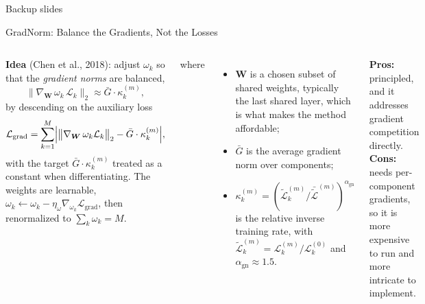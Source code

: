 \documentclass[aspectratio=169,11pt]{beamer}
\newcommand{\emphc}[1]{\textcolor{harvardcrimson}{#1}}
\begin{document}

\appendix

\begin{frame}{}
\begin{center}
{\Huge \textcolor{uzhblue}{Backup slides}}
\end{center}
\end{frame}

\begin{frame}{GradNorm: Balance the Gradients, Not the Losses}
\begin{columns}[T]
\textbf{Idea} (Chen et al., 2018): adjust $\omega_k$ so that the \emph{gradient norms} are balanced,
\[
    \bigl\|\nabla_{\bm{W}}\, \omega_k \, \mathcal{L}_k\bigr\|_2 \approx \bar{G} \cdot \kappa_k^{(m)} ,
\]
by descending on the auxiliary loss
\[
    \mathcal{L}_{\mathrm{grad}} = \sum_{k=1}^{M} \Bigl| \bigl\| \nabla_{\bm{W}}\, \omega_k \mathcal{L}_k \bigr\|_2 - \bar{G} \cdot \kappa_k^{(m)} \Bigr| ,
\]
with the target $\bar G \cdot \kappa_k^{(m)}$ treated as a \emphc{constant} when differentiating. The weights are learnable, $\omega_k \gets \omega_k - \eta_\omega \nabla_{\omega_k} \mathcal{L}_{\mathrm{grad}}$, then renormalized to $\sum_k \omega_k = M$.

where
\begin{itemize}\itemsep2pt\footnotesize
    \item $\bm{W}$ is a \emphc{chosen subset of shared weights}, typically the last shared layer, which is what makes the method affordable;
    \item $\bar{G}$ is the average gradient norm over components;
    \item $\kappa_k^{(m)} = (\tilde{\mathcal{L}}_k^{(m)} / \bar{\tilde{\mathcal{L}}}^{(m)})^{\alpha_{\mathrm{gn}}}$ is the relative inverse training rate, with $\tilde{\mathcal{L}}_k^{(m)} = \mathcal{L}_k^{(m)} / \mathcal{L}_k^{(0)}$ and $\alpha_{\mathrm{gn}} \approx 1.5$.
\end{itemize}

\vspace{0.3cm}
{\footnotesize \textbf{Pros:} principled, and it addresses gradient competition directly.\\[3pt]
\textbf{Cons:} needs per-component gradients, so it is more expensive to run and more intricate to implement.}
\end{columns}
\end{frame}
\end{document}
